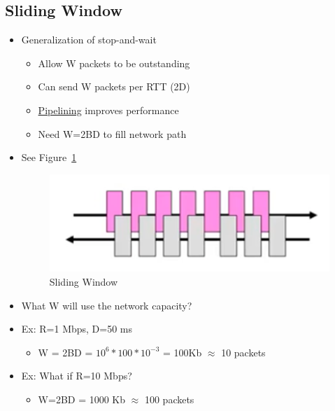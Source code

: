 \documentclass[12pt]{ctexart}   %
\begin{document}
	\subsection{Sliding Window}
	\begin{itemize}
		\item Generalization of stop-and-wait
		\begin{itemize}
			\item Allow W packets to be outstanding
			\item Can send W packets per RTT (2D)
			\item \underline{Pipelining} improves performance
			\item Need W=2BD to fill network path
		\end{itemize}
		\item See Figure~\ref{fig:6-5-3}
		  
		 \begin{figure}[h!] %
		\centering
		 \includegraphics[scale=0.7]{images/6-5-3}
		\caption{  Sliding Window }
		 \label{fig:6-5-3}
		 \end{figure}
		 
		 \item What W will use the network capacity?
		 \item Ex: R=1 Mbps, D=50 ms
		 \begin{itemize}
		 	\item W = 2BD = $10^{6} * 100 * 10^{-3}$ = 100Kb $\approx$ 10 packets
		 \end{itemize}
		 
		 \item Ex: What if R=10 Mbps?
		 \begin{itemize}
		 	\item W=2BD = 1000 Kb $\approx$ 100 packets
		 \end{itemize}
	\end{itemize}
	
\end{document}
